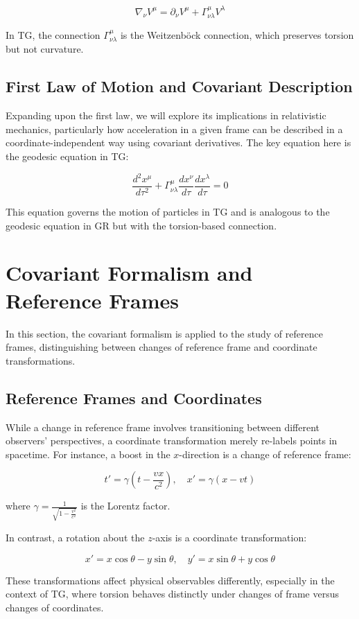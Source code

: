 \documentclass[12pt]{article}
\begin{document}
\[
\nabla_\nu V^\mu = \partial_\nu V^\mu + \Gamma^\mu_{\nu\lambda} V^\lambda
\]

In TG, the connection \( \Gamma^\mu_{\nu\lambda} \) is the Weitzenböck connection, which preserves torsion but not curvature.

\subsection{First Law of Motion and Covariant Description}
Expanding upon the first law, we will explore its implications in relativistic mechanics, particularly how acceleration in a given frame can be described in a coordinate-independent way using covariant derivatives. The key equation here is the geodesic equation in TG:

\[
\frac{d^2 x^\mu}{d\tau^2} + \Gamma^\mu_{\nu\lambda} \frac{dx^\nu}{d\tau} \frac{dx^\lambda}{d\tau} = 0
\]

This equation governs the motion of particles in TG and is analogous to the geodesic equation in GR but with the torsion-based connection.

\section{Covariant Formalism and Reference Frames}
In this section, the covariant formalism is applied to the study of reference frames, distinguishing between changes of reference frame and coordinate transformations.

\subsection{Reference Frames and Coordinates}
While a change in reference frame involves transitioning between different observers' perspectives, a coordinate transformation merely re-labels points in spacetime. For instance, a boost in the \( x \)-direction is a change of reference frame:

\[
t' = \gamma (t - \frac{vx}{c^2}), \quad x' = \gamma (x - vt)
\]

where \( \gamma = \frac{1}{\sqrt{1 - \frac{v^2}{c^2}}} \) is the Lorentz factor.

In contrast, a rotation about the \( z \)-axis is a coordinate transformation:

\[
x' = x \cos \theta - y \sin \theta, \quad y' = x \sin \theta + y \cos \theta
\]

These transformations affect physical observables differently, especially in the context of TG, where torsion behaves distinctly under changes of frame versus changes of coordinates.
\end{document}
